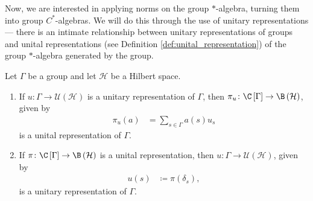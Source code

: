 Now, we are interested in applying norms on the group $\ast$-algebra, turning them into group $C^{\ast}$-algebras. We will do this through the use of unitary representations --- there is an intimate relationship between unitary representations of groups and unital representations (see Definition \ref{def:unital_representation}) of the group $\ast$-algebra generated by the group.
\begin{proposition}\label{prop:unital_unitary_representation}
  Let $\Gamma$ be a group and let $\mathcal{H}$ be a Hilbert space.
  \begin{enumerate}[(1)]
    \item If $u\colon \Gamma\rightarrow \mathcal{U}\left( \mathcal{H} \right)$ is a unitary representation of $\Gamma$, then $\pi_u\colon \C\left[ \Gamma \right]\rightarrow \B\left( \mathcal{H} \right)$, given by
      \begin{align*}
        \pi_u(a) &= \sum_{s\in\Gamma}a(s)u_s
      \end{align*}
      is a unital representation of $\Gamma$.
    \item If $\pi\colon \C\left[ \Gamma \right]\rightarrow \B\left( \mathcal{H} \right)$ is a unital representation, then $u\colon \Gamma\rightarrow \mathcal{U}\left( \mathcal{H} \right)$, given by
      \begin{align*}
        u(s) &\coloneq \pi\left( \delta_s \right),
      \end{align*}
      is a unitary representation of $\Gamma$.
  \end{enumerate}
\end{proposition}
